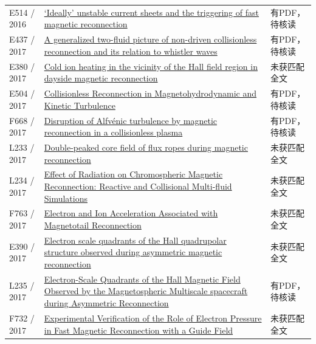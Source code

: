 \documentclass[UTF8,a4paper,11pt,openany,fontset=fandol]{ctexbook}
\begin{document}
\begin{longtable}{P{24mm}P{97mm}P{27mm}}
E514 / 2016 & \href{https://doi.org/10.1017/s002237781600088x}{‘Ideally’ unstable current sheets and the triggering of fast magnetic reconnection} & 有PDF，待核读\\

E437 / 2017 & \href{https://doi.org/10.1063/1.4982812}{A generalized two-fluid picture of non-driven collisionless reconnection and its relation to whistler waves} & 有PDF，待核读\\

E380 / 2017 & \href{https://confit.atlas.jp/guide/event/jpguagu2017/subject/PEM13-03/detail}{Cold ion heating in the vicinity of the Hall field region in dayside magnetic reconnection} & 未获匹配全文\\

E504 / 2017 & \href{https://doi.org/10.3847/1538-4357/aa9754}{Collisionless Reconnection in Magnetohydrodynamic and Kinetic Turbulence} & 有PDF，待核读\\

F668 / 2017 & \href{https://doi.org/10.1017/s0022377817000812}{Disruption of Alfvénic turbulence by magnetic reconnection in a collisionless plasma} & 有PDF，待核读\\

L233 / 2017 & \href{https://doi.org/10.1002/2017ja024233}{Double‐peaked core field of flux ropes during magnetic reconnection} & 未获匹配全文\\

L234 / 2017 & \href{https://doi.org/10.3847/1538-4357/aa7554}{Effect of Radiation on Chromospheric Magnetic Reconnection: Reactive and Collisional Multi-fluid Simulations} & 未获匹配全文\\

F763 / 2017 & \href{https://escholarship.org/uc/item/0kf95194}{Electron and Ion Acceleration Associated with Magnetotail Reconnection} & 未获匹配全文\\

E390 / 2017 & \href{https://ui.adsabs.harvard.edu/abs/2019EGUGA..21.6241W/abstract}{Electron scale quadrants of the Hall quadrupolar structure observed during asymmetric magnetic reconnection} & 未获匹配全文\\

L235 / 2017 & \href{https://doi.org/10.1103/physrevlett.118.175101}{Electron-Scale Quadrants of the Hall Magnetic Field Observed by the Magnetospheric Multiscale spacecraft during Asymmetric Reconnection} & 有PDF，待核读\\

F732 / 2017 & \href{https://doi.org/10.1103/physrevlett.118.125002}{Experimental Verification of the Role of Electron Pressure in Fast Magnetic Reconnection with a Guide Field} & 未获匹配全文\\


\end{longtable}
\end{document}
